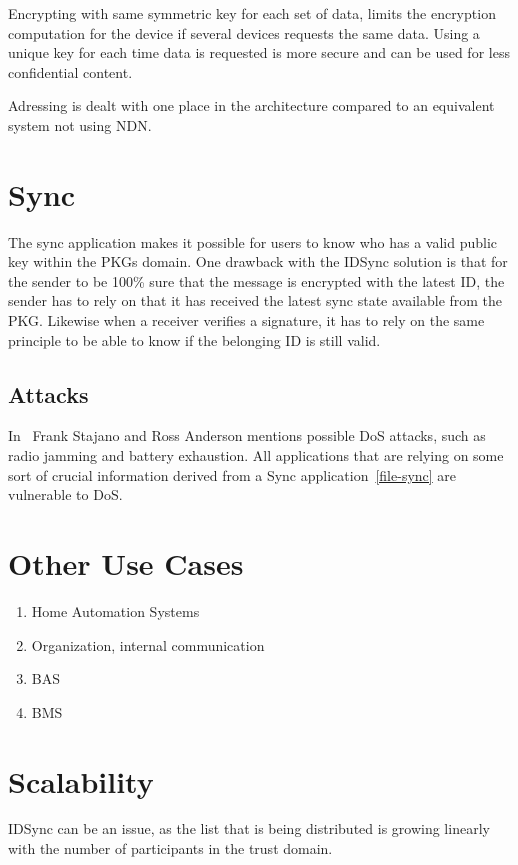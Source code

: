 Encrypting with same symmetric key for each set of data, limits the encryption computation for the device if several devices requests the same data.
Using a unique key for each time data is requested is more secure and can be used for less confidential content.

Adressing is dealt with one place in the architecture compared to an equivalent system not using \gls{NDN}. 


\section{Sync}
The sync application makes it possible for users to know who has a valid public key within the \gls{PKG}s domain.
One drawback with the IDSync solution is that for the sender to be 100\% sure that the message is encrypted with the latest \gls{ID}, the sender has to rely on that it has received the latest sync state available from the \gls{PKG}.
Likewise when a receiver verifies a signature, it has to rely on the same principle to be able to know if the belonging \gls{ID} is still valid.

\subsection{Attacks}
In~\cite{DBLP:conf/spw/StajanoA99} Frank Stajano and Ross Anderson mentions possible \gls{DoS} attacks, such as radio jamming and battery exhaustion. 
All applications that are relying on some sort of crucial information derived from a Sync application~\autoref{file-sync} are vulnerable to \gls{DoS}.

\section{Other Use Cases}

\begin{enumerate}
	\item Home Automation Systems
	\item Organization, internal communication
	\item \gls{BAS}
	\item \gls{BMS}
\end{enumerate}

\section{Scalability}
IDSync can be an issue, as the list that is being distributed is growing linearly with the number of participants in the trust domain.
